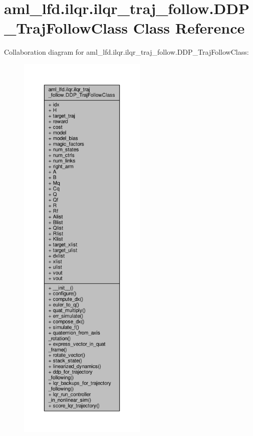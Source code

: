 \hypertarget{classaml__lfd_1_1ilqr_1_1ilqr__traj__follow_1_1_d_d_p___traj_follow_class}{\section{aml\-\_\-lfd.\-ilqr.\-ilqr\-\_\-traj\-\_\-follow.\-D\-D\-P\-\_\-\-Traj\-Follow\-Class Class Reference}
\label{classaml__lfd_1_1ilqr_1_1ilqr__traj__follow_1_1_d_d_p___traj_follow_class}
}


Collaboration diagram for aml\-\_\-lfd.\-ilqr.\-ilqr\-\_\-traj\-\_\-follow.\-D\-D\-P\-\_\-\-Traj\-Follow\-Class\-:\nopagebreak
\begin{figure}[H]
\begin{center}
\leavevmode
\includegraphics[height=550pt]{classaml__lfd_1_1ilqr_1_1ilqr__traj__follow_1_1_d_d_p___traj_follow_class__coll__graph}
\end{center}
\end{figure}
